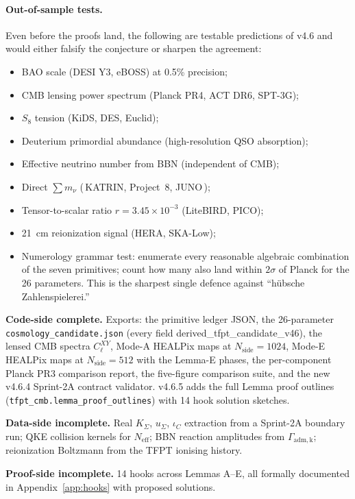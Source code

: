 \documentclass[11pt,a4paper]{article}
\begin{document}
\paragraph{Out-of-sample tests.} Even before the proofs land, the
following are testable predictions of v4.6 and would either
falsify the conjecture or sharpen the agreement:
\begin{itemize}[leftmargin=1.4em]
\item BAO scale (DESI Y3, eBOSS) at 0.5\% precision;
\item CMB lensing power spectrum (Planck PR4, ACT DR6, SPT-3G);
\item \(S_8\) tension (KiDS, DES, Euclid);
\item Deuterium primordial abundance (high-resolution QSO absorption);
\item Effective neutrino number from BBN (independent of CMB);
\item Direct \(\sum m_\nu\) (\,KATRIN, Project~8, JUNO\,);
\item Tensor-to-scalar ratio \(r=3.45\times 10^{-3}\) (LiteBIRD,
PICO);
\item 21~cm reionization signal (HERA, SKA-Low);
\item Numerology grammar test: enumerate every reasonable
algebraic combination of the seven primitives; count how many also
land within \(2\sigma\) of Planck for the 26 parameters.  This is the
sharpest single defence against ``hübsche Zahlenspielerei.''
\end{itemize}

\begin{tfptexports}
\textbf{Code-side complete.} Exports: the primitive ledger JSON, the
26-parameter \texttt{cosmology\_candidate.json} (every field
\textsf{derived\_tfpt\_candidate\_v46}), the lensed CMB spectra
\(C_\ell^{XY}\), Mode-A HEALPix maps at \(N_{\mathrm{side}}=1024\),
Mode-E HEALPix maps at \(N_{\mathrm{side}}=512\) with the Lemma-E
phases, the per-component Planck PR3 comparison report, the
five-figure comparison suite, and the new v4.6.4 Sprint-2A contract
validator.  v4.6.5 adds the full Lemma proof outlines
(\texttt{tfpt\_cmb.lemma\_proof\_outlines}) with 14 hook solution
sketches.

\textbf{Data-side incomplete.} Real \(K_\Sigma\), \(u_\Sigma\),
\(\iota_C\) extraction from a Sprint-2A boundary run; QKE collision
kernels for \(N_{\mathrm{eff}}\); BBN reaction amplitudes from
\(\Gamma_{\mathrm{adm,k}}\); reionization Boltzmann from the TFPT
ionising history.

\textbf{Proof-side incomplete.} 14 hooks across Lemmas A--E, all
formally documented in Appendix~\ref{app:hooks} with proposed
solutions.
\end{tfptexports}
\end{document}
